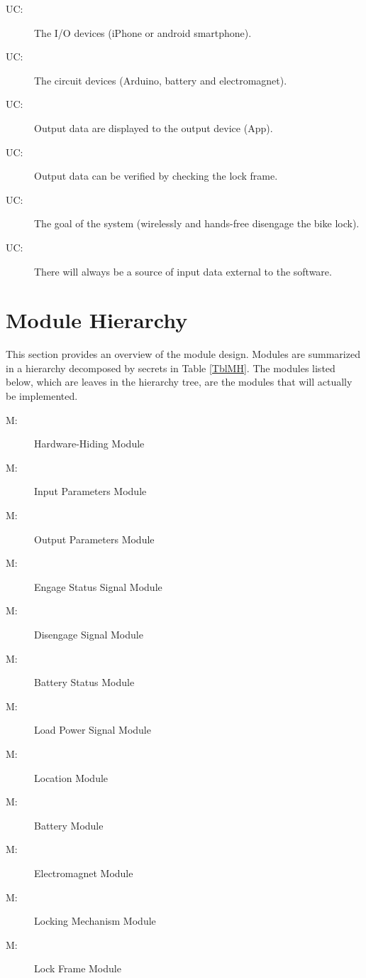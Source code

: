 \documentclass[12pt, titlepage]{article}
\newcounter{ucnum}
\newcommand{\uctheucnum}{UC\theucnum}
\newcounter{mnum}
\newcommand{\mthemnum}{M\themnum}
\begin{document}
\begin{description}

\item[\uctheucnum\label{ucIO}:] The I/O devices (iPhone or android smartphone). 
\item[\uctheucnum\label{ucCircuit}:] The circuit devices (Arduino, battery and electromagnet). 
\item[\uctheucnum\label{ucOutput}:] Output data are displayed to the output device (App). 
\item[\uctheucnum\label{ucVerify}:] Output data can be verified by checking the lock frame. 
\item[\uctheucnum\label{ucGoal}:] The goal of the system (wirelessly and hands-free disengage the bike lock). 
\item[\uctheucnum\label{ucInput}:] There will always be a source of input data external to the software.

\end{description}

\section{Module Hierarchy} \label{SecMH}

This section provides an overview of the module design. Modules are summarized
in a hierarchy decomposed by secrets in Table \ref{TblMH}. The modules listed
below, which are leaves in the hierarchy tree, are the modules that will
actually be implemented.

\begin{description}
\item [ \mthemnum \label{mHH}:] Hardware-Hiding Module
\item [ \mthemnum \label{mIP}:] Input Parameters Module 
\item [ \mthemnum \label{mOP}:] Output Parameters Module 
\item [ \mthemnum \label{mESS}:] Engage Status Signal Module 
\item [ \mthemnum \label{mDS}:] Disengage Signal Module 
\item [ \mthemnum \label{mBS}:] Battery Status Module 
\item [ \mthemnum \label{mLPS}:] Load Power Signal Module 
\item [ \mthemnum \label{mL}:] Location Module 
\item [ \mthemnum \label{mB}:] Battery Module 
\item [ \mthemnum \label{mEM}:] Electromagnet Module 
\item [ \mthemnum \label{mLM}:] Locking Mechanism Module 
\item [ \mthemnum \label{mLF}:] Lock Frame Module 

\end{description}
\end{document}
